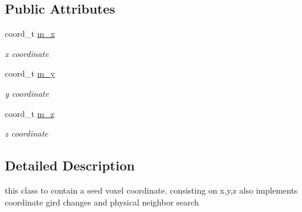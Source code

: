 \subsection*{\-Public \-Attributes}
\begin{DoxyCompactItemize}
\item 
\hypertarget{classWHcoord_aff62663740e60363f99fd6951b68e761}{coord\-\_\-t \hyperlink{classWHcoord_aff62663740e60363f99fd6951b68e761}{m\-\_\-x}}\label{classWHcoord_aff62663740e60363f99fd6951b68e761}

\begin{DoxyCompactList}\small\item\em x coordinate \end{DoxyCompactList}\item 
\hypertarget{classWHcoord_aebd2a93712cf57652663538972330189}{coord\-\_\-t \hyperlink{classWHcoord_aebd2a93712cf57652663538972330189}{m\-\_\-y}}\label{classWHcoord_aebd2a93712cf57652663538972330189}

\begin{DoxyCompactList}\small\item\em y coordinate \end{DoxyCompactList}\item 
\hypertarget{classWHcoord_a63f1338fd188785c21667d16067abb89}{coord\-\_\-t \hyperlink{classWHcoord_a63f1338fd188785c21667d16067abb89}{m\-\_\-z}}\label{classWHcoord_a63f1338fd188785c21667d16067abb89}

\begin{DoxyCompactList}\small\item\em z coordinate \end{DoxyCompactList}\end{DoxyCompactItemize}


\subsection{\-Detailed \-Description}
this class to contain a seed voxel coordinate. consisting on x,y,z also implements coordinate gird changes and physical neighbor search 

